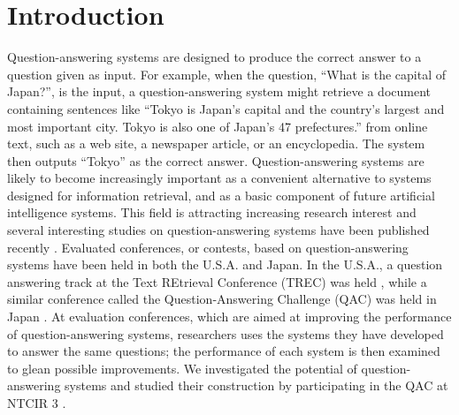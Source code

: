 


\maketitle

\section{Introduction}

Question-answering systems are designed 
to produce the correct answer to a question given as input. 
For example, when the question, ``What is the capital of Japan?'', is the input, 
a question-answering system might retrieve a document containing sentences like 
``Tokyo is Japan's capital and the country's largest and most important city. Tokyo is
also one of Japan's 47 prefectures.'' 
from online text, such as a web site, a newspaper article, or an
encyclopedia. The system then outputs ``Tokyo'' as the correct answer. 
Question-answering systems are likely to become increasingly important as a 
convenient alternative to systems designed for information retrieval, and as a 
basic component of future artificial intelligence systems. 
This field is attracting increasing research interest 
and several 
interesting studies on question-answering systems have been published recently \cite{MURAX,IBM_QA2001,Harabagiu_tois,Sasaki_yutaka_ieice,takahashi_ieice_qa}. 
Evaluated conferences, or contests, 
based on question-answering systems have been held in both the U.S.A. and Japan. 
In the U.S.A., a question answering track at the Text REtrieval Conference (TREC) was held \cite{trec8qa}, while
a similar conference called 
the Question-Answering Challenge (QAC) was held in Japan \cite{qac_hp}.
At evaluation conferences, which are aimed at improving the performance of question-answering systems, 
researchers uses the systems they have developed 
to answer the same questions; the performance of
each system is then examined to glean possible improvements.  
We investigated the potential of question-answering systems \cite{qa_memo2} and 
studied their construction by participating in the 
QAC \cite{qac1} at NTCIR 3 \cite{Murata_ntcir3_qa}. 

